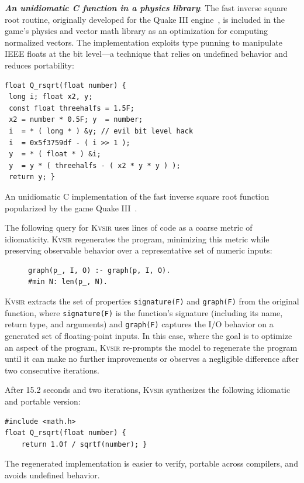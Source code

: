 \documentclass[sigplan,review,anonymous,10pt]{acmart}
\newcommand{\sys}{{\scshape Kv{\textalpha}sir}\xspace}
\newcommand{\heading}[1]{\vspace{2pt}\noindent\textbf{\emph{#1}}:\enspace}
\begin{document}
\heading{An unidiomatic C function in a physics library}
The fast inverse square root routine, originally developed for the Quake III
engine~\cite{fast_inv_sqrt}, is included in the game's physics and vector math
library as an optimization for computing normalized vectors.
The implementation
exploits type punning to manipulate IEEE floats at the bit level—a technique
that relies on undefined behavior and reduces portability:
\begin{listing}
\begin{verbatim}
float Q_rsqrt(float number) {
 long i; float x2, y;
 const float threehalfs = 1.5F;
 x2 = number * 0.5F; y  = number;
 i  = * ( long * ) &y; // evil bit level hack
 i  = 0x5f3759df - ( i >> 1 );
 y  = * ( float * ) &i;
 y  = y * ( threehalfs - ( x2 * y * y ) );
 return y; }
\end{verbatim}
\caption{An unidiomatic C implementation of the fast inverse square root function popularized by the game Quake III~\cite{fast_inv_sqrt}.}
\end{listing}
The following query for \sys uses lines of code as a coarse metric of
idiomaticity. \sys regenerates the program, minimizing this metric while
preserving observable behavior over a representative set of numeric inputs:
\begin{figure}
  \vspace{-5pt}
  \begin{verbatim}
graph(p_, I, O) :- graph(p, I, O).
#min N: len(p_, N).
  \end{verbatim}
\end{figure}
\sys extracts the set of properties \texttt{signature(F)} and \texttt{graph(F)}
from the original function, where \texttt{signature(F)} is the function's
signature (including its name, return type, and arguments) and
\texttt{graph(F)} captures the I/O behavior on a generated set of
floating-point inputs.
In this case, where the goal is to optimize an aspect of the program, \sys
re-prompts the model to regenerate the program until it can make no further
improvements or observes a negligible difference after two consecutive
iterations.

After 15.2 seconds and two iterations, \sys synthesizes the following idiomatic and portable version:
\begin{verbatim}
#include <math.h>
float Q_rsqrt(float number) {
    return 1.0f / sqrtf(number); }
\end{verbatim}
The regenerated implementation is easier to verify, portable across compilers, and avoids undefined behavior.
\end{document}
